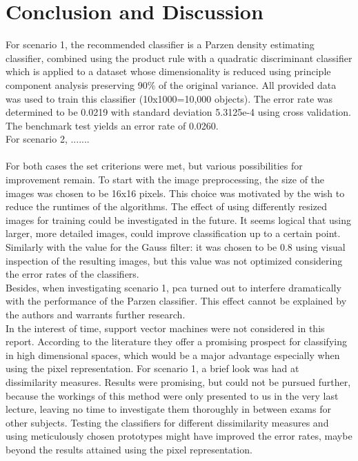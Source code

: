 \section{Conclusion and Discussion}
\label{sec:DiscConcl}

For scenario 1, the recommended classifier is a Parzen density estimating classifier, combined using the product rule with a quadratic discriminant classifier which is applied to a dataset whose dimensionality is reduced using principle component analysis preserving 90\% of the original variance. All provided data was used to train this classifier (10x1000=10,000 objects). The error rate was determined to be 0.0219 with standard deviation 5.3125e-4 using cross validation. The benchmark test yields an error rate of 0.0260.\\
For scenario 2, ....... \\
\\
\noindent For both cases the set criterions were met, but various possibilities for improvement remain. To start with the image preprocessing, the size of the images was chosen to be 16x16 pixels. This choice was motivated by the wish to reduce the runtimes of the algorithms. The effect of using differently resized images for training could be investigated in the future. It seems logical that using larger, more detailed images, could improve classification up to a certain point. Similarly with the value for the Gauss filter: it was chosen to be 0.8 using visual inspection of the resulting images, but this value was not optimized considering the error rates of the classifiers. \\
Besides, when investigating scenario 1, pca turned out to interfere dramatically with the performance of the Parzen classifier. This effect cannot be explained by the authors and warrants further research. \\
In the interest of time, support vector machines were not considered in this report. According to the literature they offer a promising prospect for classifying in high dimensional spaces, which would be a major advantage especially when using the pixel representation. For scenario 1, a brief look was had at dissimilarity measures. Results were promising, but could not be pursued further, because the workings of this method were only presented to us in the very last lecture, leaving no time to investigate them thoroughly in between exams for other subjects. Testing the classifiers for different dissimilarity measures and using meticulously chosen prototypes might have improved the error rates, maybe beyond the results attained using the pixel representation.





